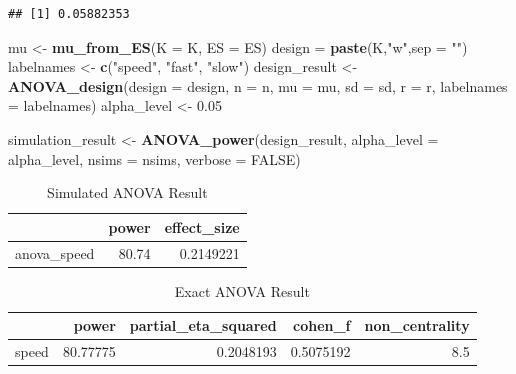 \documentclass[
]{book}
\newenvironment{Shaded}{\begin{snugshade}}{\end{snugshade}}
\newcommand{\DataTypeTok}[1]{\textcolor[rgb]{0.13,0.29,0.53}{#1}}
\newcommand{\FloatTok}[1]{\textcolor[rgb]{0.00,0.00,0.81}{#1}}
\newcommand{\KeywordTok}[1]{\textcolor[rgb]{0.13,0.29,0.53}{\textbf{#1}}}
\newcommand{\NormalTok}[1]{#1}
\newcommand{\OtherTok}[1]{\textcolor[rgb]{0.56,0.35,0.01}{#1}}
\newcommand{\StringTok}[1]{\textcolor[rgb]{0.31,0.60,0.02}{#1}}
\begin{document}
\begin{verbatim}
## [1] 0.05882353
\end{verbatim}

\begin{Shaded}
\begin{Highlighting}[]
\NormalTok{mu <-}\StringTok{ }\KeywordTok{mu_from_ES}\NormalTok{(}\DataTypeTok{K =}\NormalTok{ K, }\DataTypeTok{ES =}\NormalTok{ ES)}
\NormalTok{design =}\StringTok{ }\KeywordTok{paste}\NormalTok{(K,}\StringTok{"w"}\NormalTok{,}\DataTypeTok{sep =} \StringTok{""}\NormalTok{)}
\NormalTok{labelnames <-}\StringTok{ }\KeywordTok{c}\NormalTok{(}\StringTok{"speed"}\NormalTok{, }\StringTok{"fast"}\NormalTok{, }\StringTok{"slow"}\NormalTok{)}
\NormalTok{design_result <-}\StringTok{ }\KeywordTok{ANOVA_design}\NormalTok{(}\DataTypeTok{design =}\NormalTok{ design,}
                   \DataTypeTok{n =}\NormalTok{ n, }\DataTypeTok{mu =}\NormalTok{ mu, }\DataTypeTok{sd =}\NormalTok{ sd, }\DataTypeTok{r =}\NormalTok{ r, }
                   \DataTypeTok{labelnames =}\NormalTok{ labelnames)}
\NormalTok{alpha_level <-}\StringTok{ }\FloatTok{0.05}
\end{Highlighting}
\end{Shaded}

\begin{Shaded}
\begin{Highlighting}[]
\NormalTok{simulation_result <-}\StringTok{ }\KeywordTok{ANOVA_power}\NormalTok{(design_result, }
                                 \DataTypeTok{alpha_level =}\NormalTok{ alpha_level, }
                                 \DataTypeTok{nsims =}\NormalTok{ nsims, }\DataTypeTok{verbose =} \OtherTok{FALSE}\NormalTok{)}
\end{Highlighting}
\end{Shaded}

\newpage

\begin{table}[!h]

\caption{\label{tab:unnamed-chunk-68}Simulated ANOVA Result}
\centering
\begin{tabular}[t]{l|r|r}
\hline
  & power & effect\_size\\
\hline
anova\_speed & 80.74 & 0.2149221\\
\hline
\end{tabular}
\end{table}

\begin{table}[!h]

\caption{\label{tab:unnamed-chunk-70}Exact ANOVA Result}
\centering
\begin{tabular}[t]{l|r|r|r|r}
\hline
  & power & partial\_eta\_squared & cohen\_f & non\_centrality\\
\hline
speed & 80.77775 & 0.2048193 & 0.5075192 & 8.5\\
\hline
\end{tabular}
\end{table}
\end{document}
